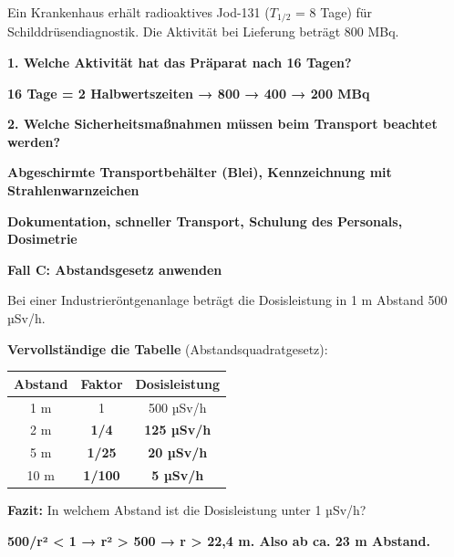 \documentclass[10pt, a4paper]{article}
\newcommand{\fachfarbe}{physik}
\newcommand{\lsg}[1]{\textcolor{loesung}{\textbf{#1}}}
\newcommand{\abschnitt}[1]{%
    \vspace{8pt}\noindent\textbf{\textcolor{\fachfarbe}{#1}}\vspace{4pt}
}
\begin{document}
\begin{merksatz}[Szenario]
Ein Krankenhaus erhält radioaktives Jod-131 ($T_{1/2}$ = 8 Tage) für Schilddrüsendiagnostik. Die Aktivität bei Lieferung beträgt 800 MBq.
\end{merksatz}

\vspace{6pt}

\textbf{1. Welche Aktivität hat das Präparat nach 16 Tagen?}

\vspace{4pt}
\lsg{16 Tage = 2 Halbwertszeiten → 800 → 400 → 200 MBq}

\vspace{8pt}

\textbf{2. Welche Sicherheitsmaßnahmen müssen beim Transport beachtet werden?}

\vspace{4pt}
\lsg{Abgeschirmte Transportbehälter (Blei), Kennzeichnung mit Strahlenwarnzeichen}

\vspace{4pt}
\lsg{Dokumentation, schneller Transport, Schulung des Personals, Dosimetrie}

\vspace{12pt}

\abschnitt{Fall C: Abstandsgesetz anwenden}

\begin{merksatz}[Szenario]
Bei einer Industrieröntgenanlage beträgt die Dosisleistung in 1 m Abstand 500 µSv/h.
\end{merksatz}

\vspace{6pt}

\textbf{Vervollständige die Tabelle} (Abstandsquadratgesetz):

\vspace{6pt}

\begin{tabular}{|c|c|c|}
\hline
\textbf{Abstand} & \textbf{Faktor} & \textbf{Dosisleistung} \\
\hline
1 m & 1 & 500 µSv/h \\
\hline
2 m & \lsg{1/4} & \lsg{125 µSv/h} \\
\hline
5 m & \lsg{1/25} & \lsg{20 µSv/h} \\
\hline
10 m & \lsg{1/100} & \lsg{5 µSv/h} \\
\hline
\end{tabular}

\vspace{12pt}

\textbf{Fazit:} In welchem Abstand ist die Dosisleistung unter 1 µSv/h?

\vspace{4pt}
\lsg{500/r² < 1 → r² > 500 → r > 22,4 m. Also ab ca. 23 m Abstand.}
\end{document}
